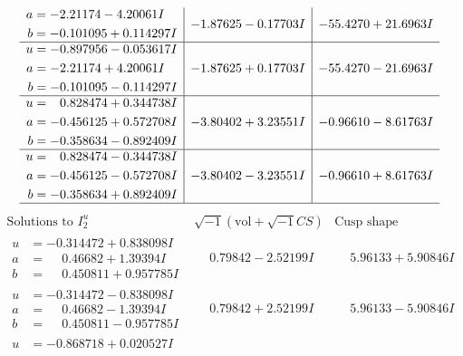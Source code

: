 \documentclass[1p]{elsarticle_modified}
\theoremstyle{definition}
\newcommand{\I}{\sqrt{-1}}
\begin{document}
$$\begin{array}{c|c|c}
\begin{aligned}
a &= -2.21174 - 4.20061 I \\
b &= -0.101095 + 0.114297 I\end{aligned}
 & -1.87625 - 0.17703 I & -55.4270 + 21.6963 I \\ \hline\begin{aligned}
u &= -0.897956 - 0.053617 I \\
a &= -2.21174 + 4.20061 I \\
b &= -0.101095 - 0.114297 I\end{aligned}
 & -1.87625 + 0.17703 I & -55.4270 - 21.6963 I \\ \hline\begin{aligned}
u &= \phantom{-}0.828474 + 0.344738 I \\
a &= -0.456125 + 0.572708 I \\
b &= -0.358634 - 0.892409 I\end{aligned}
 & -3.80402 + 3.23551 I & -0.96610 - 8.61763 I \\ \hline\begin{aligned}
u &= \phantom{-}0.828474 - 0.344738 I \\
a &= -0.456125 - 0.572708 I \\
b &= -0.358634 + 0.892409 I\end{aligned}
 & -3.80402 - 3.23551 I & -0.96610 + 8.61763 I\\
 \hline 
 \end{array}$$\newpage$$\begin{array}{c|c|c}  
\text{Solutions to }I^u_{2}& \I (\text{vol} + \sqrt{-1}CS) & \text{Cusp shape}\\
 \hline 
\begin{aligned}
u &= -0.314472 + 0.838098 I \\
a &= \phantom{-}0.46682 + 1.39394 I \\
b &= \phantom{-}0.450811 + 0.957785 I\end{aligned}
 & \phantom{-}0.79842 - 2.52199 I & \phantom{-}5.96133 + 5.90846 I \\ \hline\begin{aligned}
u &= -0.314472 - 0.838098 I \\
a &= \phantom{-}0.46682 - 1.39394 I \\
b &= \phantom{-}0.450811 - 0.957785 I\end{aligned}
 & \phantom{-}0.79842 + 2.52199 I & \phantom{-}5.96133 - 5.90846 I \\ \hline\begin{aligned}
u &= -0.868718 + 0.020527 I \\

\end{aligned}
\end{array}$$
\end{document}
